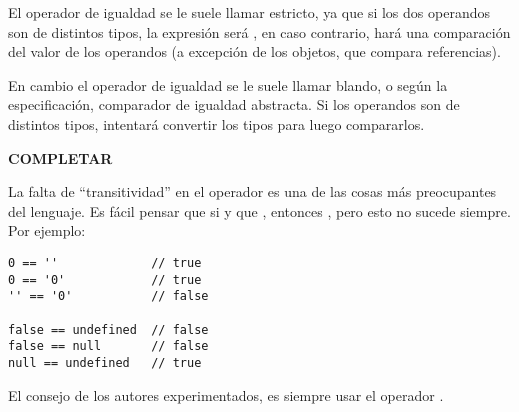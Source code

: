 El operador de igualdad \code{===} se le suele llamar estricto, ya que si los dos operandos son de distintos tipos, la expresión será , en caso contrario, hará una comparación del valor de los operandos (a excepción de los objetos, que compara referencias).

En cambio el operador de igualdad \code{==} se le suele llamar blando, o según la especificación, comparador de igualdad abstracta. Si los operandos son de distintos tipos, intentará convertir los tipos para luego compararlos.

\textbf{COMPLETAR}

La falta de "`transitividad"' en el operador \code{==} es una de las cosas más preocupantes del lenguaje. Es fácil pensar que si  y que , entonces , pero esto no sucede siempre.  Por ejemplo:

\begin{lstlisting}[title={Falta de transitividad en \code{==}}]
0 == ''             // true
0 == '0'            // true
'' == '0'           // false

false == undefined  // false
false == null       // false
null == undefined   // true
\end{lstlisting}

El consejo de los autores experimentados, es siempre usar el operador \code{===}.

